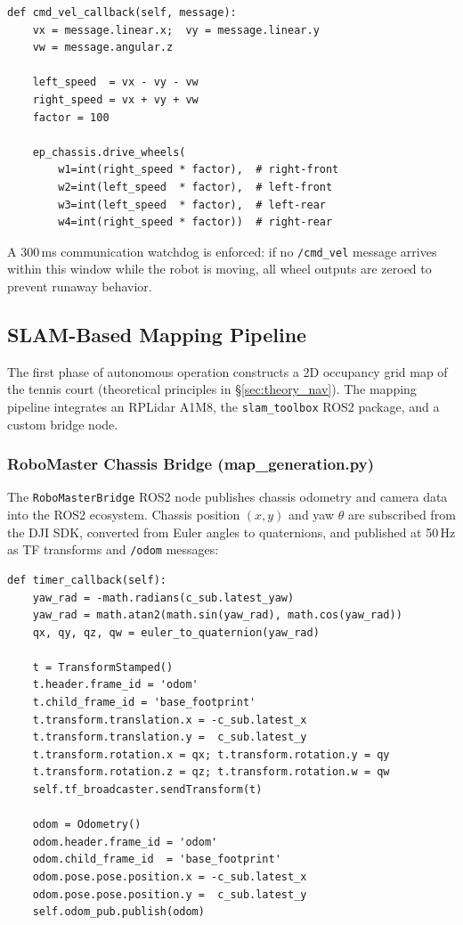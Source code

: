 \begin{verbatim}
def cmd_vel_callback(self, message):
    vx = message.linear.x;  vy = message.linear.y
    vw = message.angular.z

    left_speed  = vx - vy - vw
    right_speed = vx + vy + vw
    factor = 100

    ep_chassis.drive_wheels(
        w1=int(right_speed * factor),  # right-front
        w2=int(left_speed  * factor),  # left-front
        w3=int(left_speed  * factor),  # left-rear
        w4=int(right_speed * factor))  # right-rear
\end{verbatim}

A 300\,ms communication watchdog is enforced: if no \texttt{/cmd\_vel} message arrives within this window while the robot is moving, all wheel outputs are zeroed to prevent runaway behavior.


\subsection{SLAM-Based Mapping Pipeline}
\label{sec:slam}

The first phase of autonomous operation constructs a 2D occupancy grid map of the tennis court (theoretical principles in \S\ref{sec:theory_nav}). The mapping pipeline integrates an RPLidar A1M8, the \texttt{slam\_toolbox} ROS2 package, and a custom bridge node.

\subsubsection{RoboMaster Chassis Bridge (map\_generation.py)}
\label{sec:map_generation}

The \texttt{RoboMasterBridge} ROS2 node publishes chassis odometry and camera data into the ROS2 ecosystem. Chassis position $(x, y)$ and yaw $\theta$ are subscribed from the DJI SDK, converted from Euler angles to quaternions, and published at 50\,Hz as TF transforms and \texttt{/odom} messages:

\begin{verbatim}
def timer_callback(self):
    yaw_rad = -math.radians(c_sub.latest_yaw)
    yaw_rad = math.atan2(math.sin(yaw_rad), math.cos(yaw_rad))
    qx, qy, qz, qw = euler_to_quaternion(yaw_rad)

    t = TransformStamped()
    t.header.frame_id = 'odom'
    t.child_frame_id = 'base_footprint'
    t.transform.translation.x = -c_sub.latest_x
    t.transform.translation.y =  c_sub.latest_y
    t.transform.rotation.x = qx; t.transform.rotation.y = qy
    t.transform.rotation.z = qz; t.transform.rotation.w = qw
    self.tf_broadcaster.sendTransform(t)

    odom = Odometry()
    odom.header.frame_id = 'odom'
    odom.child_frame_id  = 'base_footprint'
    odom.pose.pose.position.x = -c_sub.latest_x
    odom.pose.pose.position.y =  c_sub.latest_y
    self.odom_pub.publish(odom)
\end{verbatim}

